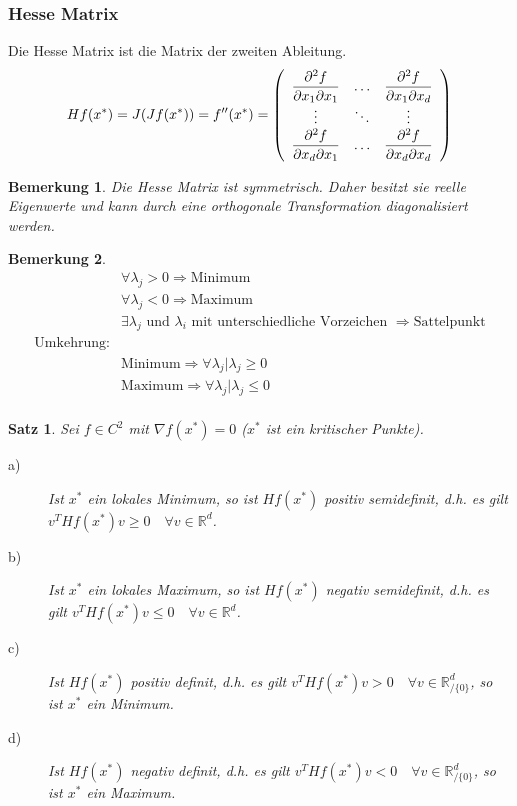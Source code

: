 \documentclass[12pt,a4paper]{article}%
\newtheorem{satz}{Satz}[section]
\newtheorem{bem}{Bemerkung}[section]
\numberwithin{equation}{section}
\newcommand{\R}{\mathbb{R}} %
\newcommand{\diffp}{\partial}
\numberwithin{equation}{subsection}
\begin{document}
  \subsubsection{Hesse Matrix}
  Die Hesse Matrix ist die Matrix der zweiten Ableitung.
  \begin{equation}
    Hf(x^*) = J(Jf(x^*)) = f''(x^*) = \left(\begin{array}{c c c} 
    \displaystyle \frac{\diffp^2f}{\diffp x_1 \diffp x_1} & \dots & \displaystyle\frac{\diffp^2 f}{\diffp x_1 \diffp x_d} \\
    \vdots & \ddots & \vdots \\
    \displaystyle\frac{\diffp^2 f}{\diffp x_d \diffp x_1} & \dots & \displaystyle\frac{\diffp^2 f}{\diffp x_d \diffp x_d} \end{array} \right)
  \end{equation}
  \begin{bem}
    Die Hesse Matrix ist symmetrisch. Daher besitzt sie reelle Eigenwerte und kann durch eine orthogonale Transformation diagonalisiert werden.
  \end{bem}
  \begin{bem}
    \begin{align}
      &\forall \lambda_j > 0 \Rightarrow \text{Minimum} \nonumber \\
      &\forall \lambda_j < 0 \Rightarrow \text{Maximum} \nonumber \\
      &\exists \lambda_j \text{ und } \lambda_i \text{ mit unterschiedliche Vorzeichen } \Rightarrow \text{Sattelpunkt} \nonumber \\
      \text{Umkehrung:} \nonumber \\
      &\text{Minimum} \Rightarrow \forall \lambda_j| \lambda_j \geq 0 \nonumber \\
      &\text{Maximum} \Rightarrow \forall \lambda_j| \lambda_j \leq 0 \nonumber \\ \label{eq:definitheit_ew}
    \end{align}
  \end{bem}
  \begin{satz}
    Sei $f \in C^2$ mit $\nabla f(x^*) = 0$ ($x^*$ ist ein kritischer Punkte).
    \begin{description}
      \item[a)] Ist $x^*$ ein lokales Minimum, so ist $Hf(x^*)$ positiv semidefinit, d.h. es gilt $v^T Hf(x^*)v \geq 0\quad \forall v \in \R^d$.
      \item[b)] Ist $x^*$ ein lokales Maximum, so ist $Hf(x^*)$ negativ semidefinit, d.h. es gilt $v^T Hf(x^*)v \leq 0\quad \forall v \in \R^d$.
      \item[c)] Ist $Hf(x^*)$ positiv definit, d.h. es gilt $v^T Hf(x^*)v > 0\quad \forall v \in \R^d_{/\lbrace 0 \rbrace}$, so ist $x^*$ ein Minimum.
      \item[d)] Ist $Hf(x^*)$ negativ definit, d.h. es gilt $v^T Hf(x^*)v < 0\quad \forall v \in \R^d_{/\lbrace 0 \rbrace}$, so ist $x^*$ ein Maximum.
    \end{description} \label{satz:definitheit_1}
  \end{satz}
  
\end{document}
